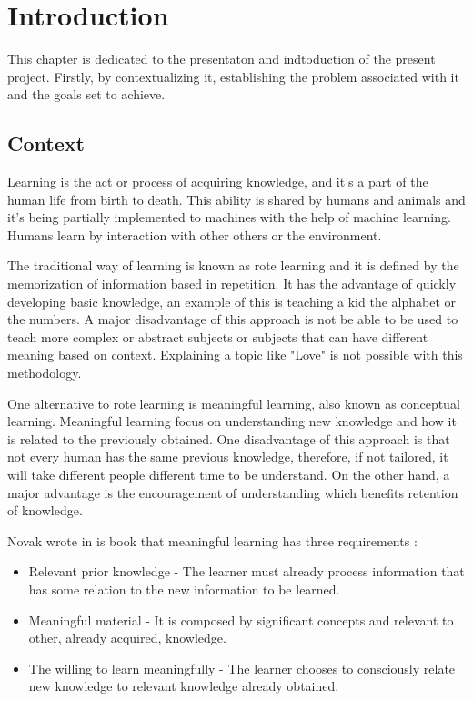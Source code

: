 %
\chapter{Introduction} %
\label{chap:Chapter1} %

This chapter is dedicated to the presentaton and indtoduction of the present project.
Firstly, by contextualizing it, establishing the problem associated with it and the goals set to achieve.

\section{Context}

Learning is the act or process of acquiring knowledge, and it's a part of the human life from birth to death.
This ability is shared by humans and animals and it's being partially implemented to machines with the help of machine learning.
Humans learn by interaction with other others or the environment.

The traditional way of learning is known as rote learning and it is defined by the memorization of information based in repetition.
It has the advantage of quickly developing basic knowledge, an example of this is teaching a kid the alphabet or the numbers.
A major disadvantage of this approach is not be able to be used to teach more complex or abstract subjects or subjects that can have different meaning based on context.
Explaining a topic like "Love" is not possible with this methodology.

One alternative to rote learning is meaningful learning, also known as conceptual learning.
Meaningful learning focus on understanding new knowledge and how it is related to the previously obtained.
One disadvantage of this approach is that not every human has the same previous knowledge, therefore, if not tailored, it will take different people different time to be understand.
On the other hand, a major advantage is the encouragement of understanding which benefits retention of knowledge.

Novak wrote in is book\cite{novak2010learning} that meaningful learning has three requirements :

\begin{itemize}
    \item Relevant prior knowledge - The learner must already process information that has some relation to the new information to be learned.
    \item Meaningful material - It is composed by significant concepts and relevant to other, already acquired, knowledge.
    \item The willing to learn meaningfully - The learner chooses to consciously relate new knowledge to relevant knowledge already obtained.
\end{itemize}

